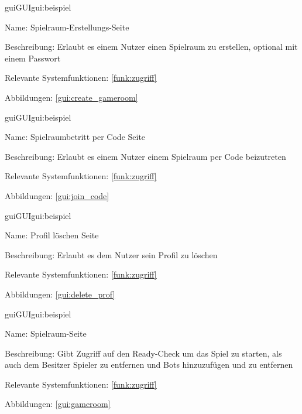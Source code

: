 \begin{description}[leftmargin=5em, style=sameline]	
	\begin{lhp}{gui}{GUI}{gui:beispiel}
		\item[Name:] Spielraum-Erstellungs-Seite
		\item[Beschreibung:] Erlaubt es einem Nutzer einen Spielraum zu erstellen, optional mit einem Passwort
		\item[Relevante Systemfunktionen:] \ref{funk:zugriff}
		\item[Abbildungen:] \ref{gui:create_gameroom}
	\end{lhp}
\end{description}

\begin{description}[leftmargin=5em, style=sameline]	
	\begin{lhp}{gui}{GUI}{gui:beispiel}
		\item[Name:] Spielraumbetritt per Code Seite
		\item[Beschreibung:] Erlaubt es einem Nutzer einem Spielraum per Code beizutreten
		\item[Relevante Systemfunktionen:] \ref{funk:zugriff}
		\item[Abbildungen:] \ref{gui:join_code}
	\end{lhp}
\end{description}

\begin{description}[leftmargin=5em, style=sameline]	
	\begin{lhp}{gui}{GUI}{gui:beispiel}
		\item[Name:] Profil löschen Seite
		\item[Beschreibung:] Erlaubt es dem Nutzer sein Profil zu löschen
		\item[Relevante Systemfunktionen:] \ref{funk:zugriff}
		\item[Abbildungen:] \ref{gui:delete_prof}
	\end{lhp}
\end{description}

\begin{description}[leftmargin=5em, style=sameline]	
	\begin{lhp}{gui}{GUI}{gui:beispiel}
		\item[Name:] Spielraum-Seite
		\item[Beschreibung:] Gibt Zugriff auf den Ready-Check um das Spiel zu starten, als auch dem Besitzer Spieler zu entfernen und Bots hinzuzufügen und zu entfernen
		\item[Relevante Systemfunktionen:] \ref{funk:zugriff}
		\item[Abbildungen:] \ref{gui:gameroom}
	\end{lhp}
\end{description}

